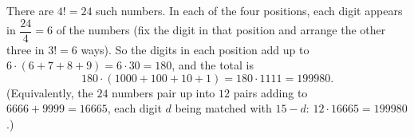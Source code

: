 There are $4!=24$ such numbers. In each of the four positions, each digit appears in $\dfrac{24}{4}=6$ of the numbers (fix the digit in that position and arrange the other three in $3!=6$ ways). So the digits in each position add up to $6\cdot(6+7+8+9)=6\cdot30=180$, and the total is
\[
180\cdot(1000+100+10+1)=180\cdot1111=\boxed{199980}.
\]
(Equivalently, the $24$ numbers pair up into $12$ pairs adding to $6666+9999=16665$, each digit $d$ being matched with $15-d$: $12\cdot16665=199980$.)
